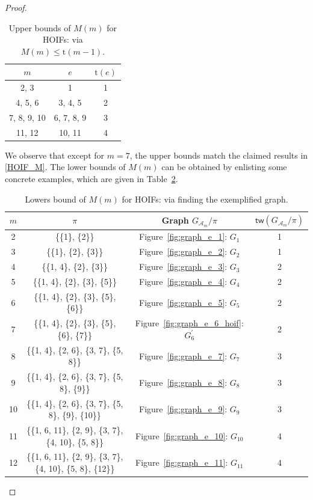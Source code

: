 \documentclass[sn-mathphys, natbib=false]{sn-jnl}
\theoremstyle{plain}
\theoremstyle{definition}
\newcommand{\treewidthp}[1]{\mathsf{tw}(#1)}
\newcommand{\graphform}[1]{G_{#1}}
\def\calA{\mathcal{A}}
\begin{document}
\begin{bibunit}[agsm]
\begin{proof}
\begin{table}[ht]
    \centering
    \caption{Upper bounds of $M(m)$ for HOIFs: via $M(m) \leq \mathrm{t}(m-1)$. }
    \label{tab:HOIF_upper_bound}
    \begin{tabular}{ccc}
        \toprule
        $m$ & $e$ & $\mathrm{t}(e)$ \\
        \midrule
        2, 3 & 1 & 1 \\
        4, 5, 6 & 3, 4, 5 & 2 \\
        7, 8, 9, 10 & 6, 7, 8, 9 & 3 \\
        11, 12 & 10, 11 & 4 \\
        \bottomrule
    \end{tabular}
\end{table}

We observe that except for $m=7$, the upper bounds match the claimed results in \eqref{HOIF_M}. The lower bounds of $M(m)$ can be obtained by enlisting some concrete examples, which are given in Table~\ref{tab:HOIF_lower_bound}. 

\begin{table}[h]
\centering
\caption{Lowers bound of $M(m)$ for HOIFs: via finding the exemplified graph.}
\label{tab:HOIF_lower_bound}
\begin{tabular}{c c c c}
\toprule
$m$ & $\pi$ & Graph $\graphform{\calA_{m}} /\pi$ & $\treewidthp{\graphform{\calA_{m}} /\pi}$ \\
\midrule
2  & \{\{1\}, \{2\}\} & Figure~\ref{fig:graph_e_1}: $G_1$ & 1 \\
3  & \{\{1\}, \{2\}, \{3\}\} & Figure~\ref{fig:graph_e_2}: $G_2$ & 1 \\
4  & \{\{1, 4\}, \{2\}, \{3\}\} & Figure~\ref{fig:graph_e_3}: $G_3$ & 2 \\
5  & \{\{1, 4\}, \{2\}, \{3\}, \{5\}\} & Figure~\ref{fig:graph_e_4}: $G_4$ & 2 \\
6  & \{\{1, 4\}, \{2\}, \{3\}, \{5\}, \{6\}\} & Figure~\ref{fig:graph_e_5}: $G_5$ & 2 \\
7  & \{\{1, 4\}, \{2\}, \{3\}, \{5\}, \{6\}, \{7\}\} & Figure~\ref{fig:graph_e_6_hoif}: $G_6^{\prime}$ & 2 \\
8  & \{\{1, 4\}, \{2, 6\}, \{3, 7\}, \{5, 8\}\} & Figure~\ref{fig:graph_e_7}: $G_7$ & 3 \\
9  & \{\{1, 4\}, \{2, 6\}, \{3, 7\}, \{5, 8\}, \{9\}\} & Figure~\ref{fig:graph_e_8}: $G_8$ & 3 \\
10 & \{\{1, 4\}, \{2, 6\}, \{3, 7\}, \{5, 8\}, \{9\}, \{10\}\} & Figure~\ref{fig:graph_e_9}: $G_9$ & 3 \\
11 & \{\{1, 6, 11\}, \{2, 9\}, \{3, 7\}, \{4, 10\}, \{5, 8\}\} & Figure~\ref{fig:graph_e_10}: $G_{10}$ & 4 \\
12 & \{\{1, 6, 11\}, \{2, 9\}, \{3, 7\}, \{4, 10\}, \{5, 8\}, \{12\}\} & Figure~\ref{fig:graph_e_11}: $G_{11}$ & 4 \\
\bottomrule
\end{tabular}
\end{table}



\end{proof}
\end{bibunit}
\end{document}
